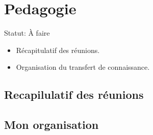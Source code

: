 \section{Pedagogie}

Statut: À faire
\begin{itemize}
    \item Récapitulatif des réunions.
    \item Organisation du transfert de connaissance.
\end{itemize}

\subsection{Recapilulatif des réunions}

\subsection{Mon organisation}
